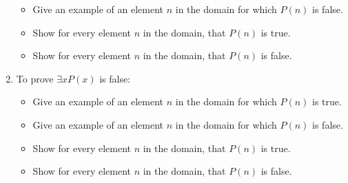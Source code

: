 \documentclass[11pt,]{book}
\theoremstyle{ptxplainnotitle}
\theoremstyle{ptxplaintitle}
\theoremstyle{ptxdefinitionnotitle}
\theoremstyle{ptxdefinitiontitle}
\theoremstyle{ptxdefinitionnotitle}
\theoremstyle{ptxdefinitiontitle}
\theoremstyle{ptxdefinitionnotitle}
\theoremstyle{ptxdefinitiontitle}
\theoremstyle{ptxdefinitiontitlenonumber}
\theoremstyle{ptxdefinitiontitlenonumber}
\numberwithin{equation}{chapter}
\begin{document}
\begin{divisionexercise}{9}
\begin{enumerate}[label=\alph*.]
\begin{itemize}[label=$\odot$,leftmargin=3em,]
\item{}\hypertarget{p-2218}{}%
Give an example of an element \(n\) in the domain for which \(P(n)\) is false.%

\item{}\hypertarget{p-2219}{}%
Show for every element \(n\) in the domain, that \(P(n)\) is true.%

\item{}\hypertarget{p-2220}{}%
Show for every element \(n\) in the domain, that \(P(n)\) is false.%

\end{itemize}
%
\item\hypertarget{li-1100}{}\hypertarget{p-2221}{}%
To prove \(\exists x P(x)\) is false:%
\par
\hypertarget{p-2222}{}%
\par
\begin{itemize}[label=$\odot$,leftmargin=3em,]
\item{}\hypertarget{p-2223}{}%
Give an example of an element \(n\) in the domain for which \(P(n)\) is true.%

\item{}\hypertarget{p-2224}{}%
Give an example of an element \(n\) in the domain for which \(P(n)\) is false.%

\item{}\hypertarget{p-2225}{}%
Show for every element \(n\) in the domain, that \(P(n)\) is true.%

\item{}\hypertarget{p-2226}{}%
Show for every element \(n\) in the domain, that \(P(n)\) is false.%

\end{itemize}
%
\end{enumerate}
%
\end{divisionexercise}%
\end{document}
